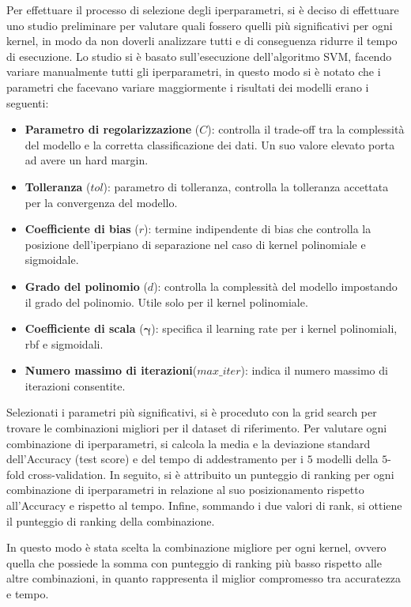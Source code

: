 Per effettuare il processo di selezione degli iperparametri, si è deciso di
effettuare uno studio preliminare per valutare quali fossero quelli più
significativi per ogni kernel, in modo da non doverli analizzare tutti e di
conseguenza ridurre il tempo di esecuzione. Lo studio si è basato sull'esecuzione
dell'algoritmo SVM, facendo variare manualmente tutti gli iperparametri, in questo
modo si è notato che i parametri che facevano variare maggiormente i risultati
dei modelli erano i seguenti:
\begin{itemize}
    \item \textbf{Parametro di regolarizzazione} ($C$): controlla il trade-off tra
          la complessità del modello e la corretta classificazione dei dati.
          Un suo valore elevato porta ad avere un hard margin.
    \item \textbf{Tolleranza} ($tol$): parametro di tolleranza, controlla la
          tolleranza accettata per la convergenza del modello.
    \item \textbf{Coefficiente di bias} ($r$): termine indipendente di bias che
          controlla la posizione dell'iperpiano di separazione nel caso di
          kernel polinomiale e sigmoidale.
    \item \textbf{Grado del polinomio} ($d$): controlla la complessità del modello
          impostando il grado del polinomio. Utile solo per il kernel polinomiale.
    \item \textbf{Coefficiente di scala} ($\boldsymbol{\gamma}$): specifica il learning
          rate per i kernel polinomiali, rbf e sigmoidali.
    \item \textbf{Numero massimo di iterazioni}($max\_iter$): indica il numero massimo
          di iterazioni consentite.
\end{itemize}

Selezionati i parametri più significativi, si è proceduto con la grid search
per trovare le combinazioni migliori per il dataset di riferimento. Per valutare
ogni combinazione di iperparametri, si calcola la media e la deviazione standard
dell'Accuracy (test score) e del tempo di addestramento per i $5$ modelli della $5$-fold
cross-validation.
In seguito, si è attribuito un punteggio di ranking per ogni combinazione
di iperparametri in relazione al suo posizionamento rispetto all'Accuracy e rispetto
al tempo. Infine, sommando i due valori di rank, si ottiene il punteggio di ranking
della combinazione.

In questo modo è stata scelta la combinazione migliore per ogni kernel, ovvero quella che possiede la somma
con punteggio di ranking più basso rispetto alle altre combinazioni, in quanto rappresenta
il miglior compromesso tra accuratezza e tempo.


